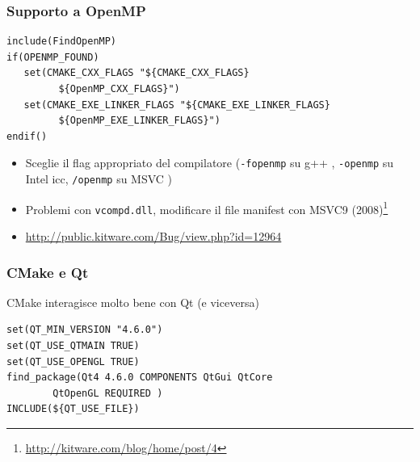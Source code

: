 \documentclass[10pt] {beamer}
\begin{document}
\begin{frame}[fragile]
 \frametitle{Supporto a OpenMP}
\begin{footnotesize}
\begin{verbatim}
include(FindOpenMP)
if(OPENMP_FOUND)
   set(CMAKE_CXX_FLAGS "${CMAKE_CXX_FLAGS} 
         ${OpenMP_CXX_FLAGS}")
   set(CMAKE_EXE_LINKER_FLAGS "${CMAKE_EXE_LINKER_FLAGS} 
         ${OpenMP_EXE_LINKER_FLAGS}")
endif()
\end{verbatim}
\end{footnotesize}
\begin{itemize}
 \item Sceglie il flag appropriato del compilatore (\texttt{-fopenmp} su g++ , \texttt{-openmp} su Intel icc, \texttt{/openmp} su MSVC )
 \item Problemi con \texttt{vcompd.dll}, modificare il file manifest con MSVC9 (2008)\footnote{\url{http://kitware.com/blog/home/post/4}}
\item \url{http://public.kitware.com/Bug/view.php?id=12964}
\end{itemize}

\end{frame}


\begin{frame}[fragile]
\frametitle{CMake e Qt}
CMake interagisce molto bene con Qt (e viceversa)
\begin{footnotesize}
\begin{verbatim}
set(QT_MIN_VERSION "4.6.0")
set(QT_USE_QTMAIN TRUE)
set(QT_USE_OPENGL TRUE)
find_package(Qt4 4.6.0 COMPONENTS QtGui QtCore 
	    QtOpenGL REQUIRED )
INCLUDE(${QT_USE_FILE})
\end{verbatim}
\end{footnotesize}
\end{frame}

\end{document}
